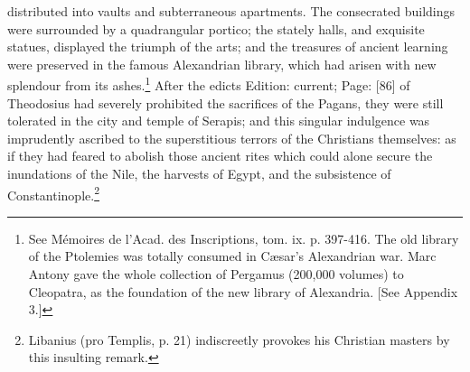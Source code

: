distributed into vaults and subterraneous apartments. The consecrated buildings were surrounded by a quadrangular portico; the stately halls, and exquisite statues, displayed the triumph of the arts; and the treasures of ancient learning were preserved in the famous Alexandrian library, which had arisen with new splendour from its ashes.\footnote{See Mémoires de l\texthebrew{}’Acad. des Inscriptions, tom. ix. p. 397-416. The old library of the Ptolemies was totally consumed in Cæsar\texthebrew{}’s Alexandrian war. Marc Antony gave the whole collection of Pergamus (200,000 volumes) to Cleopatra, as the foundation of the new library of Alexandria. [See Appendix 3.]} After the edicts Edition: current; Page: [86] of Theodosius had severely prohibited the sacrifices of the Pagans, they were still tolerated in the city and temple of Serapis; and this singular indulgence was imprudently ascribed to the superstitious terrors of the Christians themselves: as if they had feared to abolish those ancient rites which could alone secure the inundations of the Nile, the harvests of Egypt, and the subsistence of Constantinople.\footnote{Libanius (pro Templis, p. 21) indiscreetly provokes his Christian masters by this insulting remark.}


